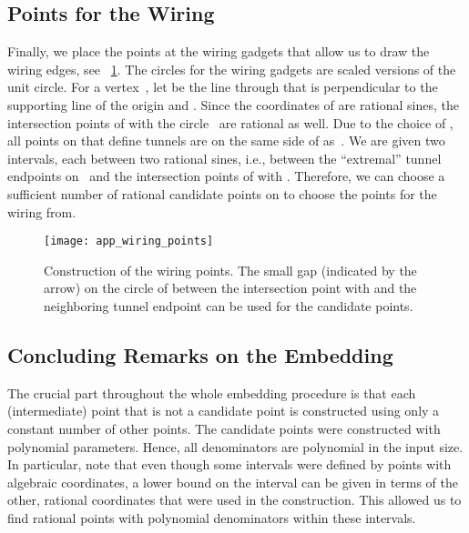 \documentclass[11pt,a4paper]{article}
\begin{document}
\subsection{Points for the Wiring}
Finally, we place the points at the wiring gadgets that allow us to draw the wiring edges, see \figurename~\ref{fig_app_wiring_points}.
The circles for the wiring gadgets are scaled versions of the unit circle.
For a vertex~, let  be the line through  that is perpendicular to the supporting line of the origin  and .
Since the coordinates of  are rational sines, the intersection points of  with the circle~ are rational as well.
Due to the choice of , all points on  that define tunnels are on the same side of  as~.
We are given two intervals, each between two rational sines, i.e., between the ``extremal'' tunnel endpoints on~ and the intersection points of  with .
Therefore, we can choose a sufficient number of rational candidate points on  to choose the points for the wiring from.

\begin{figure}
\centering
\texttt{[image: app\_wiring\_points]}
\caption{Construction of the wiring points.
The small gap (indicated by the arrow) on the circle  of  between the intersection point with  and the neighboring tunnel endpoint can be used for the candidate points.}
\label{fig_app_wiring_points}
\end{figure}


\subsection{Concluding Remarks on the Embedding}
The crucial part throughout the whole embedding procedure is that each (intermediate) point that is not a candidate point is constructed using only a constant number of other points.
The candidate points were constructed with polynomial parameters.
Hence, all denominators are polynomial in the input size.
In particular, note that even though some intervals were defined by points with algebraic coordinates, a lower bound on the interval can be given in terms of the other, rational coordinates that were used in the construction.
This allowed us to find rational points with polynomial denominators within these intervals.


\ifarxiv

\else

\fi

\end{document}
